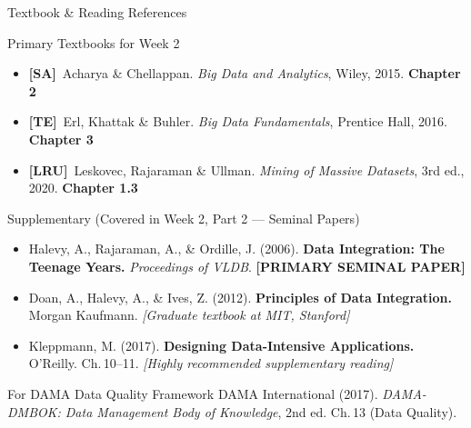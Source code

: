 \documentclass[aspectratio=169,10pt]{beamer}
\begin{document}
\begin{frame}{Textbook \& Reading References}
  \begin{block}{Primary Textbooks for Week 2}
    \begin{itemize}
      \item \textbf{[SA]}\ Acharya \& Chellappan. \textit{Big Data and Analytics}, Wiley, 2015.
            \hfill \textbf{Chapter 2}
      \item \textbf{[TE]}\ Erl, Khattak \& Buhler. \textit{Big Data Fundamentals}, Prentice Hall, 2016.
            \hfill \textbf{Chapter 3}
      \item \textbf{[LRU]}\ Leskovec, Rajaraman \& Ullman. \textit{Mining of Massive Datasets}, 3rd ed., 2020.
            \hfill \textbf{Chapter 1.3}
    \end{itemize}
  \end{block}
  \vspace{6pt}
  \begin{exampleblock}{Supplementary (Covered in Week 2, Part 2 — Seminal Papers)}
    \begin{itemize}
      \small
      \item Halevy, A., Rajaraman, A., \& Ordille, J. (2006). \textbf{Data Integration: The Teenage Years.} \textit{Proceedings of VLDB}. \textbf{[PRIMARY SEMINAL PAPER]}
      \item Doan, A., Halevy, A., \& Ives, Z. (2012). \textbf{Principles of Data Integration.} Morgan Kaufmann. \textit{[Graduate textbook at MIT, Stanford]}
      \item Kleppmann, M. (2017). \textbf{Designing Data-Intensive Applications.} O'Reilly. Ch.\,10--11. \textit{[Highly recommended supplementary reading]}
    \end{itemize}
  \end{exampleblock}
  \vspace{4pt}
  \begin{alertblock}{For DAMA Data Quality Framework}
    \small DAMA International (2017). \textit{DAMA-DMBOK: Data Management Body of Knowledge}, 2nd ed.  Ch.\,13 (Data Quality).
  \end{alertblock}
\end{frame}
\end{document}
